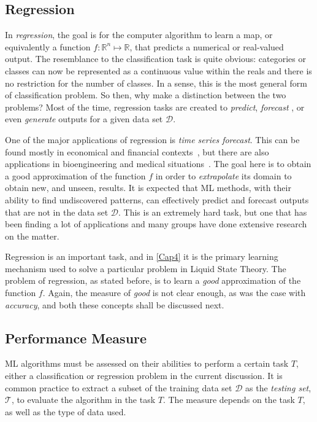 \subsection{Regression}
In \emph{regression}, the goal is for the computer algorithm to learn a map, or 
equivalently a function $f \colon \mathbb{R}^n \mapsto \mathbb{R}$, that predicts a 
numerical or real-valued output. The resemblance to the classification task is quite 
obvious: categories or classes can now be represented as a continuous value within the 
reals and there is no restriction for the number of classes. In a sense, this is the most 
general form of classification problem. So then, why make a distinction between the two 
problems? Most of the time, regression tasks are created to \emph{predict}, \emph{forecast}
, or even \emph{generate} outputs for a given data set $\mathcal{D}$.

One of the major applications of regression is \emph{time series forecast}. This can 
be found mostly in economical and financial contexts~\cite{bontempiMachineLearningStrategies2013,sezerFinancialTimeSeries2020}, but there are also 
applications in bioengineering and medical situations~\cite{mccoyAssessmentTimeSeriesMachine2018}. The goal here is to obtain a good approximation of 
the function $f$ in order to \emph{extrapolate} its 
domain to obtain new, and unseen, results. It is expected that ML methods, with their 
ability to find undiscovered 
patterns, can effectively predict and forecast outputs that are not in the data set 
$\mathcal{D}$. This is an extremely hard task, but one that has been finding a lot of 
applications and many groups have done extensive research on the matter.

Regression is an important task, and in \autoref{Cap4} it is the primary learning mechanism 
used to solve a particular problem in Liquid State Theory. The problem of regression, as 
stated before, is to learn a \emph{good} approximation of the function $f$. Again, the 
measure of \emph{good} is not clear enough, as was the case with \emph{accuracy}, and both 
these concepts shall be discussed next.

\subsection{Performance Measure}
ML algorithms must be assessed on their abilities to perform a certain task $T$, either a 
classification or regression problem in the current discussion. 
It is common practice to extract a subset of the 
training data set $\mathcal{D}$ as the \emph{testing set}, $\mathcal{T}$, to evaluate the 
algorithm in the task $T$. The measure depends on the task $T$, as well as the type of data 
used.

